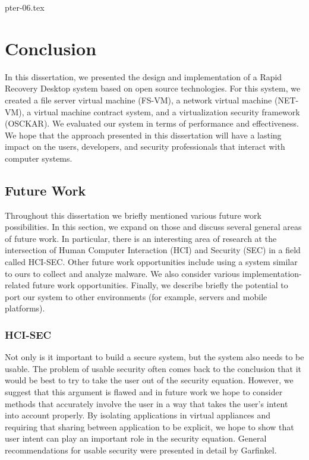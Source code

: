 pter-06.tex

\chapter{Conclusion}

In this dissertation, we presented the design and implementation of a Rapid Recovery Desktop system based on open source technologies. For this system, we created a file server virtual machine (FS-VM), a network virtual machine (NET-VM), a virtual machine contract system, and a virtualization security framework (OSCKAR). We evaluated our system in terms of performance and effectiveness. We hope that the approach presented in this dissertation will have a lasting impact on the users, developers, and security professionals that interact with computer systems.


\section{Future Work}

Throughout this dissertation we briefly mentioned various future work possibilities. In this section, we expand on those and discuss several general areas of future work. In particular, there is an interesting area of research at the intersection of Human Computer Interaction (HCI) and Security (SEC) in a field called HCI-SEC. Other future work opportunities include using a system similar to ours to collect and analyze malware. We also consider various implementation-related future work opportunities. Finally, we describe briefly the potential to port our system to other environments (for example, servers and mobile platforms).

\subsection{HCI-SEC}

Not only is it important to build a secure system, but the system also needs to be usable. The problem of usable security often comes back to the conclusion that it would be best to try to take the user out of the security equation\cite{cranor_2008}. However, we suggest that this argument is flawed and in future work we hope to consider methods that accurately involve the user in a way that takes the user's intent into account properly. By isolating applications in virtual appliances and requiring that sharing between application to be explicit, we hope to show that user intent can play an important role in the security equation. General recommendations for usable security were presented in detail by Garfinkel\cite{simson_2006}.

